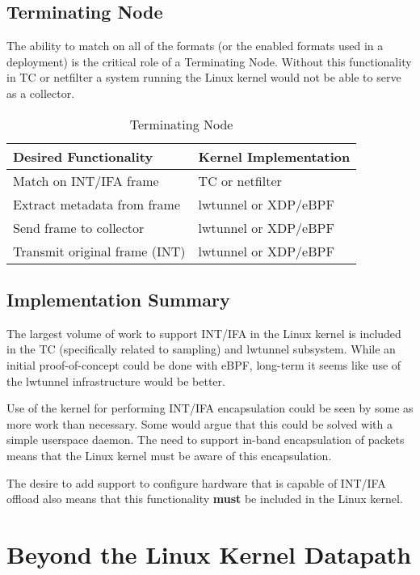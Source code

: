 \documentclass[letterpaper,twocolumn,10pt]{article}
\begin{document}
\subsection{Terminating Node}
The ability to match on all of the formats (or the enabled formats used
in a deployment) is the critical role of a Terminating Node.  Without this
functionality in TC or netfilter a system running the Linux kernel would
not be able to serve as a collector.
\begin{table}[h!]
  \begin{center}
    \caption{Terminating Node}
    \label{tab:table3}
    \begin{tabular}{l|l}
      \textbf{Desired Functionality} & \textbf{Kernel Implementation} \\
      \hline
      Match on INT/IFA frame & TC or netfilter \\
      \hline
      Extract metadata from frame & lwtunnel or XDP/eBPF \\
      \hline
      Send frame to collector & lwtunnel or XDP/eBPF \\
      \hline
      Transmit original frame (INT) & lwtunnel or XDP/eBPF \\
    \end{tabular}
  \end{center}
\end{table}


\subsection{Implementation Summary}
The largest volume of work to support INT/IFA in the Linux kernel
is included in the TC (specifically related to sampling) and lwtunnel
subsystem.  While an initial proof-of-concept could be done with eBPF,
long-term it seems like use of the lwtunnel infrastructure would be
better.

Use of the kernel for performing INT/IFA encapsulation could be seen by
some as more work than necessary.  Some would argue that this could be
solved with a simple userspace daemon.  The need to support
in-band encapsulation of packets means that the Linux kernel
must be aware of this encapsulation.

The desire to add support to configure hardware that is capable of
INT/IFA offload also means that this functionality \textbf{must} be
included in the Linux kernel.

\section{Beyond the Linux Kernel Datapath}
\end{document}
